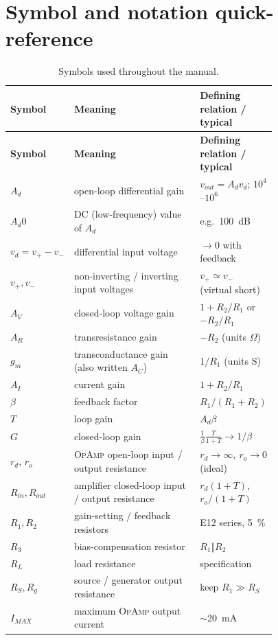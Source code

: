 \documentclass[11pt,a4paper,oneside]{book}
\newcommand{\vd}{v_d}
\newcommand{\Ad}{A_d}
\newcommand{\op}{\textsc{OpAmp}}
\begin{document}
\section{Symbol and notation quick-reference}
\begin{longtable}{@{}lp{0.50\linewidth}p{0.27\linewidth}@{}}
\caption{Symbols used throughout the manual.}\label{tab:symbols}\\
\toprule
\textbf{Symbol} & \textbf{Meaning} & \textbf{Defining relation / typical}\\
\midrule\endfirsthead
\toprule
\textbf{Symbol} & \textbf{Meaning} & \textbf{Defining relation / typical}\\
\midrule\endhead
$\Ad$ & open-loop differential gain & $v_{out}=\Ad\vd$; $10^4$--$10^6$\\
$\Ad0$ & DC (low-frequency) value of $\Ad$ & e.g.\ \qty{100}{\dB}\\
$\vd=v_+-v_-$ & differential input voltage & $\to0$ with feedback\\
$v_+,v_-$ & non-inverting / inverting input voltages & $v_+\simeq v_-$ (virtual short)\\
$A_V$ & closed-loop voltage gain & $1+R_2/R_1$ or $-R_2/R_1$\\
$A_R$ & transresistance gain & $-R_2$ (units $\Omega$)\\
$g_m$ & transconductance gain (also written $A_C$) & $1/R_1$ (units S)\\
$A_I$ & current gain & $1+R_2/R_1$\\
$\beta$ & feedback factor & $R_1/(R_1+R_2)$\\
$T$ & loop gain & $\Ad\beta$\\
$G$ & closed-loop gain & $\tfrac1\beta\tfrac{T}{1+T}\to1/\beta$\\
$r_d,\,r_o$ & \op{} open-loop input / output resistance & $r_d\to\infty,\ r_o\to0$ (ideal)\\
$R_{in},R_{out}$ & amplifier closed-loop input / output resistance & $r_d(1+T)$, $r_o/(1+T)$\\
$R_1,R_2$ & gain-setting / feedback resistors & E12 series, \qty{5}{\percent}\\
$R_3$ & bias-compensation resistor & $R_1\Vert R_2$\\
$R_L$ & load resistance & specification\\
$R_S,R_g$ & source / generator output resistance & keep $R_1\gg R_S$\\
$I_{MAX}$ & maximum \op{} output current & $\sim$\qty{20}{\milli\ampere}\\

\end{longtable}
\end{document}
